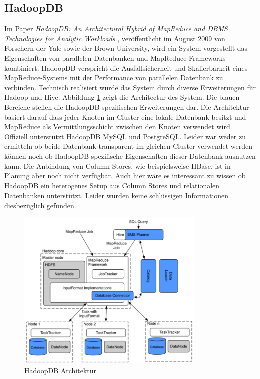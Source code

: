 \documentclass[a4paper]{article}
\begin{document}
\subsection{HadoopDB}
\cite{HadoopDB2009}
Im Paper \textit{HadoopDB: An Architectural Hybrid of MapReduce and DBMS Technologies for Analytic Workloads} \cite{HadoopDB2009}, veröffentlicht im August 2009 von Forschern der Yale sowie der Brown University, wird ein System vorgestellt das Eigenschaften von parallelen Datenbanken und MapReduce-Frameworks kombiniert. HadoopDB verspricht die Ausfallsicherheit und Skalierbarkeit eines MapReduce-Systems mit der Performance von parallelen Datenbank zu verbinden. Technisch realisiert wurde das System durch diverse Erweiterungen für Hadoop und Hive. Abbildung \ref{fig:hadoopdb} zeigt die Architectur des System. Die blauen Bereiche stellen die HadoopDB-spezifischen Erweiterungen dar. Die Architektur basiert darauf dass jeder Knoten im Cluster eine lokale Datenbank besitzt und MapReduce als Vermittlungsschicht zwischen den Knoten verwendet wird. Offiziell unterstützt HadoopDB MySQL und PostgreSQL. Leider war weder zu ermitteln ob beide Datenbank transparent im gleichen Cluster verwendet werden können noch ob HadoopDB spezifische Eigenschaften dieser Datenbank ausnutzen kann. Die Anbindung von Column Stores, wie beispielsweise HBase, ist in Planung aber noch nicht verfügbar. Auch hier wäre es interessant zu wissen ob HadoopDB ein heterogenes Setup aus Column Stores und relationalen Datenbanken unterstützt. Leider wurden keine schlüssigen Informationen diesbezüglich gefunden.

\begin{figure}[H]
\centering
\includegraphics[width=0.8\textwidth]{hadoopdb-architecture.png}
\caption{HadoopDB Architektur \cite{HadoopDB2010}}
\label{fig:hadoopdb}
\end{figure}
\end{document}
